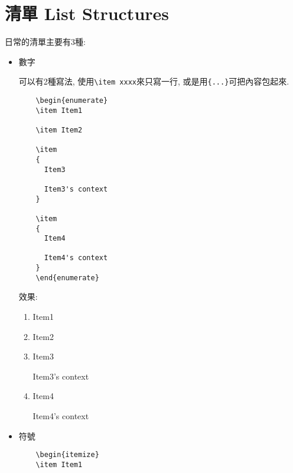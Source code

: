 \newpage
\section{清單 List Structures}

  日常的清單主要有3種:

\begin{itemize}
  \item
  {
  數字

  可以有2種寫法, 使用\verb|\item xxxx|來只寫一行, 或是用\verb|{...}|可把內容包起來.
  \begin{framed}
  \begin{verbatim}
    \begin{enumerate}
    \item Item1

    \item Item2

    \item
    {
      Item3

      Item3's context
    }

    \item
    {
      Item4

      Item4's context
    }
    \end{enumerate}
  \end{verbatim}
  \end{framed}

  效果:
  \begin{enumerate}
    \item Item1

    \item Item2

    \item
    {
      Item3

      Item3's context
    }

    \item
    {
      Item4

      Item4's context
    }
  \end{enumerate}
  } %

  \newpage
  \item
  {
  符號

  \begin{framed}
  \begin{verbatim}
    \begin{itemize}
    \item Item1


\end{verbatim}
\end{framed}}
\end{itemize}
